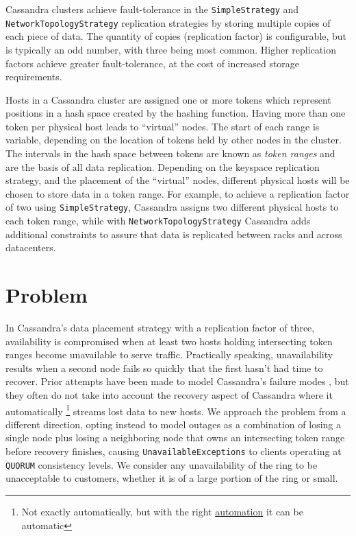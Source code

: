 \documentclass{article}
\begin{document}
Cassandra clusters achieve fault-tolerance in the \texttt{SimpleStrategy}
and \\
\texttt{NetworkTopologyStrategy} replication strategies by storing multiple
copies of each piece of data. The quantity of copies (replication factor) is
configurable, but is typically an odd number, with three being most common.
Higher replication factors achieve greater fault-tolerance, at the cost of
increased storage requirements.

Hosts in a Cassandra cluster are assigned one or more tokens which represent
positions in a hash space created by the hashing function. Having more than
one token per physical host leads to ``virtual'' nodes. The start of each
range is variable, depending on the location of tokens held by other nodes
 in the cluster. The intervals in the hash space between tokens are known as
\textit{token ranges} and are the basis of all data replication. Depending on
the keyspace replication strategy, and the placement of the ``virtual'' nodes,
different physical hosts will be chosen to store data in a token range.
For example, to achieve a replication factor of two using
\texttt{SimpleStrategy}, Cassandra assigns two different physical hosts to
each token range, while with \texttt{NetworkTopologyStrategy} Cassandra adds
additional constraints to assure that data is replicated between racks and
across datacenters.

\section{Problem}
\label{sec:problem}

In Cassandra's data placement strategy with a replication factor of three,
availability is compromised when at least two hosts holding intersecting token
ranges become unavailable to serve traffic. Practically speaking, unavailability
results when a second node fails so quickly that the first hasn't had time to recover.
Prior attempts have been made to model Cassandra's failure modes \cite{dataloss},
but they often do not take into account the recovery aspect of Cassandra where
it automatically \footnote{Not exactly automatically, but with the right
\href{https://github.com/Netflix/Priam}{automation} it can be automatic}
streams lost data to new hosts. We approach the problem from a different
direction, opting instead to model outages as a combination of losing a single
node plus losing a neighboring node that owns an intersecting token range
before recovery finishes, causing \texttt{UnavailableExceptions} to clients
operating at \texttt{QUORUM} consistency levels. We consider any unavailability of
the ring to be unacceptable to customers, whether it is of a large portion of the
ring or small.
\end{document}
